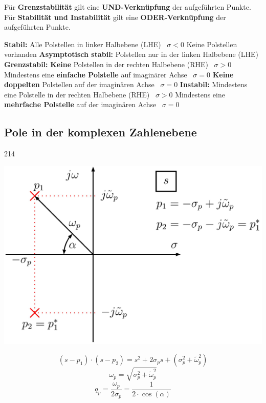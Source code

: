 Für \textbf{Grenzstabilität} gilt eine \textbf{UND-Verknüpfung} der aufgeführten Punkte. 
Für \textbf{Stabilität und Instabilität} gilt eine \textbf{ODER-Verknüpfung} der aufgeführten Punkte.

\begin{outline}
    \1 \textbf{Stabil:} 
        \2 Alle Polstellen in linker Halbebene (LHE) \textrightarrow\ $\sigma < 0$
        \2 Keine Polstellen vorhanden 
    \1 \textbf{Asymptotisch stabil:}
        \2 Polstellen nur in der linken Halbebene (LHE)
    \1 \textbf{Grenzstabil:} 
        \2 \textbf{Keine} Polstellen in der rechten Halbebene (RHE) \textrightarrow\ $\sigma > 0$
        \2 Mindestens eine \textbf{einfache Polstelle} auf imaginärer Achse \textrightarrow\ $\sigma = 0$
        \2 \textbf{Keine doppelten} Polstellen auf der imaginären Achse \textrightarrow\ $\sigma = 0$
    \1 \textbf{Instabil:} 
        \2 Mindestens eine Polstelle in der rechten Halbebene (RHE) \textrightarrow\ $\sigma > 0$
        \2 Mindestens eine \textbf{mehrfache Polstelle} auf der imaginären Achse \textrightarrow\ $\sigma = 0$
\end{outline}


\subsection{Pole in der komplexen Zahlenebene}{214}


\begin{minipage}[c]{0.45\columnwidth}
    \includegraphics[width=\columnwidth]{images/beispiel_pol_nullstellen_diagramm.png}
\end{minipage}
\hfill
\begin{minipage}[c]{0.48\columnwidth}
    $$(s - p_1) \cdot (s -p_2) = s^2 + 2 \sigma_p s + (\sigma_p^2 + \tilde{\omega}_p^2) $$
    $$ \boxed{ \omega_p = \sqrt{\sigma_p^2 + \tilde{\omega}_p^2}} $$
    $$ \boxed{ q_p = \frac{\omega_p}{2 \sigma_p} = \frac{1}{2 \cdot \cos(\alpha)}} $$
\end{minipage}

